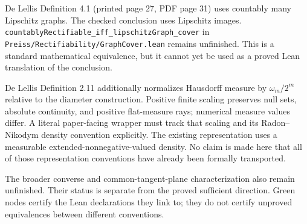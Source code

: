 De Lellis Definition 4.1 (printed page 27, PDF page 31) uses countably many
Lipschitz graphs. The checked conclusion uses Lipschitz images.
\texttt{countablyRectifiable\_iff\_lipschitzGraph\_cover} in
\texttt{Preiss/Rectifiability/GraphCover.lean} remains unfinished.
This is a standard mathematical equivalence, but it cannot yet be used
as a proved Lean translation of the conclusion.

De Lellis Definition 2.11 additionally normalizes Hausdorff measure by
$\omega_m/2^m$ relative to the diameter construction. Positive finite
scaling preserves null sets, absolute continuity, and positive flat-measure
rays; numerical measure values differ. A literal paper-facing wrapper must
track that scaling and its Radon--Nikodym density convention explicitly.
The existing representation uses a measurable extended-nonnegative-valued
density. No claim is made here that all of those representation conventions
have already been formally transported.

The broader converse and common-tangent-plane characterization also remain
unfinished. Their status is separate from the proved sufficient direction.
Green nodes certify the Lean declarations they link to; they do not certify
unproved equivalences between different conventions.
